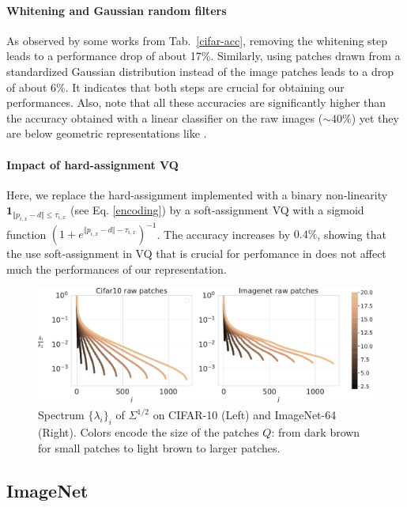 \documentclass{article}
\begin{document}
\paragraph{Whitening and Gaussian random filters}As observed by some  works from Tab.~\ref{cifar-acc}, removing the whitening step leads to  a  performance drop  of about 17\%.
Similarly, using patches drawn from a standardized Gaussian distribution  instead of  the image patches leads to a drop of about 6\%. It indicates that both steps are crucial for obtaining our performances. 
Also, note that all these accuracies are significantly higher than the accuracy obtained with a linear classifier on the raw images ($\sim40\%$) yet they are below geometric representations like \cite{Oyallon_2015_CVPR}.

\paragraph{Impact of hard-assignment VQ}
Here, we replace the hard-assignment implemented with a binary non-linearity  $\mathbf{1}_{\Vert  p_{i,x} - d\Vert \leq \tau_{i,x}}$ (see Eq. \ref{encoding}) by a soft-assignment VQ with a sigmoid function $(1 + e^{\Vert  p_{i,x} - d\Vert - \tau_{i,x}})^{-1}$.
The accuracy increases by $0.4\%$, showing that the use soft-assignment in VQ that is crucial for perfomance in \cite{coates2011analysis,coates2011importance} does not affect much the performances of our representation.

\begin{figure}
\centering
  \includegraphics[width=.8\linewidth]{figures/spectrum_patches}
  \caption{Spectrum $\{\lambda_i\}_i$ of $\Sigma^{1/2}$ on CIFAR-10 (Left) and ImageNet-64 (Right).\label{spectrum} Colors encode the size of the patches $Q$: from dark brown for small patches to light brown to larger patches.}
\end{figure}
\subsection{ImageNet}
\end{document}
